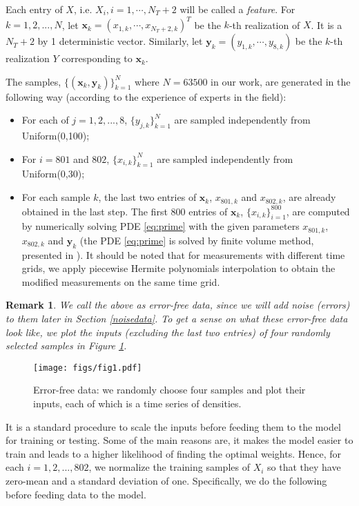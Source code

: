 \documentclass[thmsa,onecolumn,12pt]{article}%
\newtheorem{remark}{Remark}
\begin{document}
Each entry of $X$, i.e. $X_i, i=1, \cdots, N_T+2$ will be called a \emph{feature}. For $k=1,2,...,N$, let $\mathbf{x}_k=(x_{1,k}, \cdots, x_{N_T+2,k})^T$ be the $k$-th realization of $X$. It is a $N_T+2$ by 1 deterministic vector. Similarly, let $\mathbf{y}_k = (y_{1,k}, \cdots, y_{8,k})$ be the $k$-th realization $Y$ corresponding to $\mathbf{x}_k$.


The samples, $\{(\mathbf{x}_k,\mathbf{y}_k)\}_{k=1}^N$ where $N = 63500$ in our work, are generated in the following way (according to the experience of experts in the field):
\begin{itemize}
\item For each of $j=1,2,...,8$, $\{y_{j,k}\}_{k=1}^N$ are sampled independently from Uniform(0,100);
\item For $i=801$ and $802$, $\{x_{i,k}\}_{k=1}^N$ are sampled independently from Uniform(0,30);
\item For each sample $k$, the last two entries of $\mathbf{x}_k$, $x_{801,k}$ and $x_{802,k}$, are already obtained in the last step. The first 800 entries of $\mathbf{x}_k$, $\{x_{i,k}\}_{i=1}^{800}$, are computed by numerically solving PDE \eqref{eq:prime} with the given parameters $x_{801,k}$, $x_{802,k}$ and $\mathbf{y}_k$ (the PDE \eqref{eq:prime} is solved by finite volume method, presented in \cite[\S 6.1.1]{zhang2016regularization}). It should be noted that for measurements with different time grids, we apply piecewise Hermite polynomials interpolation to obtain the modified measurements on the same time grid.
\end{itemize}


\begin{remark}
We call the above as error-free data, since we will add noise (errors) to them later in Section \ref{noisedata}. To get a sense on what these error-free data look like, we plot the inputs (excluding the last two entries) of four randomly selected samples in Figure \ref{inputplot}.
\end{remark}


\begin{figure}[!htb]
	\centering
\texttt{[image: figs/fig1.pdf]}
\caption{Error-free data: we randomly choose four samples and plot their inputs, each of which is a time series of densities.}
\label{inputplot}
\end{figure}

It is a standard procedure to scale the inputs before feeding them to the model for training or testing. Some of the main reasons are, it makes the model easier to train and leads to a higher likelihood of finding the optimal weights. Hence, for each $i=1,2,...,802$, we normalize the training samples of $X_i$ so that they have zero-mean and a standard deviation of one. Specifically, we do the following before feeding data to the model.
\end{document}

